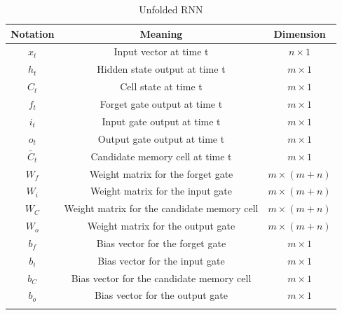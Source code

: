 \documentclass[12pt,a4paper]{article}
\begin{document}
\begin{longtable}{|c|c|c|}
    \hline
    \textbf{Notation} & \textbf{Meaning} & \textbf{Dimension}\\
    \hline
    $x_t$               & Input vector at time t                        & $n \times 1$\\
    $h_t$               & Hidden state output at time t                 & $m \times 1$\\
    $C_t$               & Cell state at time t                          & $m \times 1$\\
    $f_t$               & Forget gate output at time t                  & $m \times 1$\\
    $i_t$               & Input gate output at time t                   & $m \times 1$\\
    $o_t$               & Output gate output at time t                  & $m \times 1$\\
    $\widetilde{C_t}$   & Candidate memory cell at time t               & $m \times 1$\\
    $W_f$               & Weight matrix for the forget gate             & $m \times (m+n)$\\
    $W_i$               & Weight matrix for the input gate              & $m \times (m+n)$\\
    $W_C$               & Weight matrix for the candidate memory cell   & $m \times (m+n)$\\
    $W_o$               & Weight matrix for the output gate             & $m \times (m+n)$\\
    $b_f$               & Bias vector for the forget gate               & $m \times 1$\\
    $b_i$               & Bias vector for the input gate                & $m \times 1$\\
    $b_C$               & Bias vector for the candidate memory cell     & $m \times 1$\\
    $b_o$               & Bias vector for the output gate               & $m \times 1$\\
    \hline
    \caption{Unfolded RNN}
\end{longtable}
\end{document}
